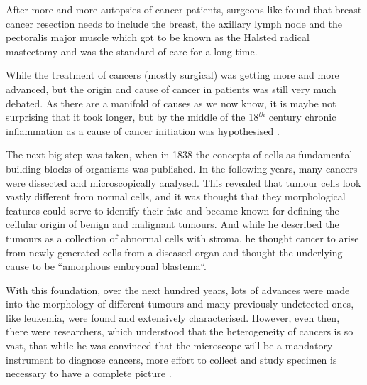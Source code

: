 After more and more autopsies of cancer patients, surgeons like \textcite{Heister1747} found that breast cancer resection needs to include the breast, the axillary lymph node and the pectoralis major muscle which got to be known as the Halsted radical mastectomy and was the standard of care for a long time.

While the treatment of cancers (mostly surgical) was getting more and more advanced, but the origin and cause of cancer in patients was still very much debated. As there are a manifold of causes as we now know, it is maybe not surprising that it took longer, but by  the middle of the 18$^{th}$ century chronic inflammation as a cause of cancer initiation was hypothesised \cite{Hajdu2010b}.

The next big step was taken, when in 1838 the concepts of cells as fundamental building blocks of organisms was published. In the following years, many cancers were dissected and microscopically analysed. This revealed that tumour cells look vastly different from normal cells, and it was thought that they morphological features could serve to identify their fate \cite{Mueller1838} and became known for defining the cellular origin of benign and malignant tumours. And while he described the tumours as a collection of abnormal cells with stroma, he thought cancer to arise from newly generated cells from a diseased organ and thought the underlying cause to be ``amorphous embryonal blastema``.

With this foundation, over the next hundred years, lots of advances were made into the morphology of different tumours and many previously undetected ones, like leukemia, were found and extensively characterised. However, even then, there were researchers, which understood that the heterogeneity of cancers is so vast, that while he was convinced that the microscope will be a mandatory instrument to diagnose cancers, more effort to collect and study specimen is necessary to have a complete picture \cite{Bennett1849}.

